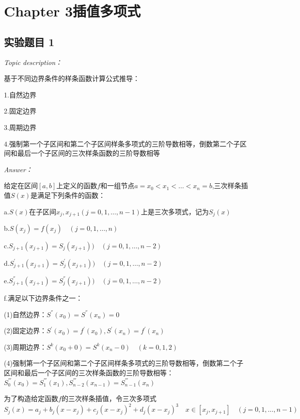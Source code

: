 \documentclass[12pt]{ctexart}
\begin{document}
\newpage


\newpage
	\section{Chapter 3\quad 插值多项式}
	\label{sec:3}
	
	\subsection{实验题目 1}
	\textit{Topic description：}
	
	基于不同边界条件的样条函数计算公式推导：
	
	1.自然边界
	
	2.固定边界
	
	3.周期边界
	
	4.强制第一个子区间和第二个子区间样条多项式的三阶导数相等，倒数第二个子区间和最后一个子区间的三次样条函数的三阶导数相等
	
	\textit{Answer：}
	
	给定在区间$[a,b]$上定义的函数$f$和一组节点$a=x_0<x_1<\dots<x_n=b$,三次样条插值$S(x)$是满足下列条件的函数：
	
	a.\quad$S(x)$在子区间$x_j,x_{j+1}$\quad$(j=0,1,\dots,n-1)$上是三次多项式，记为$S_j(x)$
	
	b.\quad$S(x_j)=f(x_j)\quad(j=0,1,\dots,n)$
	
	c.\quad$S_{j+1}(x_{j+1})=S_j(x_{j+1}))\quad(j=0,1,\dots,n-2)$
	
	d.\quad$S_{j+1}^{'}(x_{j+1})=S_j^{'}(x_{j+1}))\quad(j=0,1,\dots,n-2)$
	
	e.\quad$S_{j+1}^{''}(x_{j+1})=S_j^{''}(x_{j+1}))\quad(j=0,1,\dots,n-2)$
	
	f.\quad 满足以下边界条件之一：
	
	\qquad(1)自然边界：$S^{''}(x_0)=S^{''}(x_n)=0$
	
	\qquad(2)固定边界：$S^{'}(x_0)=f^{'}(x_0),S^{'}(x_n)=f^{'}(x_n)$
	
	\qquad(3)周期边界：$S^{k}(x_0+0)=S^{k}(x_n-0)\quad (k=0,1,2)$
	
	\qquad(4)强制第一个子区间和第二个子区间样条多项式的三阶导数相等，倒数第二个子区间和最后一个子区间的三次样条函数的三阶导数相等：$S_0^{'''}(x_0)=S_1^{'''}(x_1),S_{n-2}^{'''}(x_{n-1})=S_{n-1}^{'''}(x_{n})$
	
	为了构造给定函数$f$的三次样条插值，令三次多项式
	\begin{equation*}
	S_j(x)=a_j+b_j(x-x_j)+c_j(x-x_j)^2+d_j(x-x_j)^3\quad x\in[x_j,x_{j+1}]\quad(j=0,1,\dots,n-1)
	\end{equation*}
	
\end{document}
